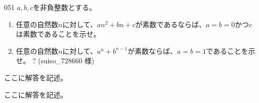 \begin{thm}{051}{}{}
 $a, b, c$を非負整数とする。
 \begin{enumerate}
  \item 任意の自然数$n$に対して、$an^2+bn+c$が素数であるならば、$a=b=0$かつ$c$は素数であることを示せ。 
  \item 任意の自然数$n$に対して、$a^n+b^{n-1}$が素数ならば、$a=b=1$であることを示せ。 \hosi ? (suiso\_728660 様)
 \end{enumerate}
\end{thm}

ここに解答を記述。

ここに解答を記述。
